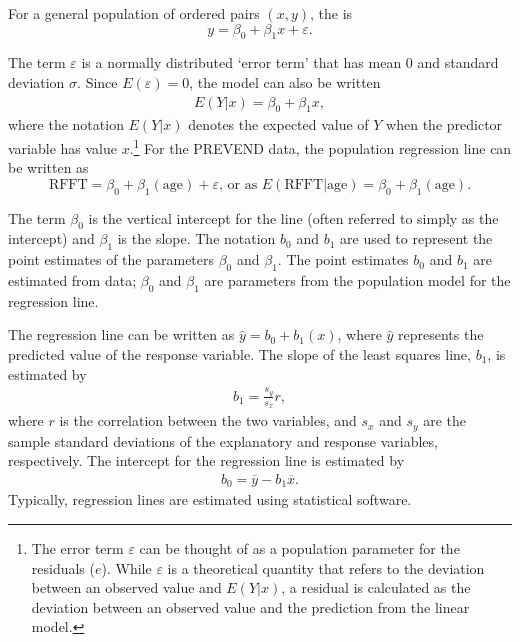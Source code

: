 For a general population of ordered pairs $(x,y)$, the  is
\[y = \beta_0 + \beta_1x + \varepsilon.
\label{equation:generalRegressionModel}
\]

The term $\varepsilon$ is a normally distributed `error term' that has mean 0 and standard deviation $\sigma$. Since $E(\varepsilon) = 0$,  the model can also be written
\begin{align*}
	E(Y|x) = \beta_0 + \beta_1 x,
\end{align*}
where the notation $E(Y|x)$ denotes the expected value of $Y$ when the predictor variable has value $x$.\footnote{The error term $\varepsilon$ can be thought of as a population parameter for the residuals ($e$). While $\varepsilon$ is a theoretical quantity that refers to the deviation between an observed value and $E(Y|x)$, a residual is calculated as the deviation between an observed value and the prediction from the linear model.} For the PREVEND data, the population regression line can be written as
\[\text{RFFT} = \beta_0 + \beta_{1}(\text{age}) + \varepsilon, \, \text{or as }
 E (\text{RFFT}| \text{age}) = \beta_0 + \beta_{1}(\text{age}).\]

The term $\beta_0$ is the vertical intercept for the line (often referred to simply as the intercept) and $\beta_1$ is the slope. The notation $b_0$ and $b_1$ are used to represent the point estimates of the parameters $\beta_0$ and $\beta_1$. The point estimates $b_0$ and $b_1$ are estimated from data; $\beta_0$ and $\beta_1$ are parameters from the population model for the regression line.

The regression line can be written as $\hat{y} = b_0 + b_1(x)$, where $\hat{y}$ represents the predicted value of the response variable. The slope of the least squares line, $b_1$, is estimated by
\begin{align}
b_1 = \frac{s_y}{s_x} r,
\label{slopeOfLSRLine}
\end{align}
where $r$ is the correlation between the two variables, and $s_x$ and $s_y$ are the sample standard deviations of the explanatory and response variables, respectively. The intercept for the regression line is estimated by
\begin{align}
b_0 = \overline{y} - b_1\overline{x}.
\label{interceptOfLSRLine}
\end{align}
Typically, regression lines are estimated using statistical software.

